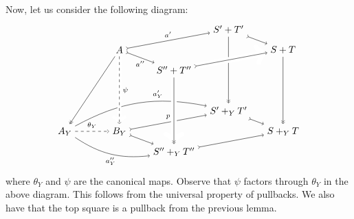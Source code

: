 \documentclass[11pt]{amsart}
\theoremstyle{remark}
\theoremstyle{definition}
\begin{document}
%
%
%
%
%
%
Now, let us consider the following diagram:
%
\begin{equation}
\label{diag.the big cube}
\begin{tikzpicture}[baseline=(current  bounding  box.center)]
	\node (A) at (2,3) {$A$};
	\node (Ay) at (0,0) {$A_Y$};
	\node (By) at (2,0) {$B_Y$};
	\node (ST) at (8,3) {$S+T$};
	\node (ST') at (6,3.75) {$S'+T'$};
	\node (ST'') at (4,2.25) {$S''+T''$};
	\node (SYT) at (8,0) {$S+_YT$};
	\node (SYT') at (6,0.75) {$S'+_YT'$};
	\node (SYT'') at (4,-0.75) {$S''+_YT''$};
	\draw [->>] (A) edge (Ay);
	\draw [font=\scriptsize,>->] (A) edge node[below] {$a''$} (ST'');
	\draw [font=\scriptsize,>->] (A) edge node[above] {$a'$} (ST');
	\draw [font=\scriptsize,->] (Ay) edge[bend left=20,pos=0.65] node[above] {$a'_Y$} (SYT');
	\draw [font=\scriptsize,->] (Ay) edge[dashed] node[above] {$\theta_Y$} (By);
	\draw [font=\scriptsize,->] (Ay) edge[bend right=20] node[below] {$a''_Y$} (SYT'');
	\draw [font=\scriptsize,>->] (By) edge node[above] {$p$} (SYT');
	\draw [>->] (By) edge (SYT'');
	\draw [->>] (ST') edge (SYT');
	\draw [>->] (ST') edge (ST);
	\draw [>->] (ST'') edge (ST);
	\draw [->>] (ST) edge (SYT);
	\draw [>->] (SYT') edge (SYT);
	\draw [>->] (SYT'') edge (SYT);
	\draw [->] (A) edge[white,line width=4pt] (By);
	\draw [font=\scriptsize,->] (A) edge[dashed] node[right] {$\psi$} (By);
	\draw [->] (ST'') edge[white,line width=6pt] (ST);
	\draw [>->] (ST'') edge (ST);
	\draw [->] (ST'') edge[white,line width=6pt] (SYT'');
	\draw [->>] (ST'') edge (SYT'');
\end{tikzpicture}
\end{equation}
%
where $\theta_Y$ and $\psi$ are the canonical maps. Observe that $\psi$ factors through $\theta_Y$ in the above diagram.  This follows from the universal property of pullbacks. We also have that the top square is a pullback from the previous lemma.
%
%
%
%
%
%
\end{document}

